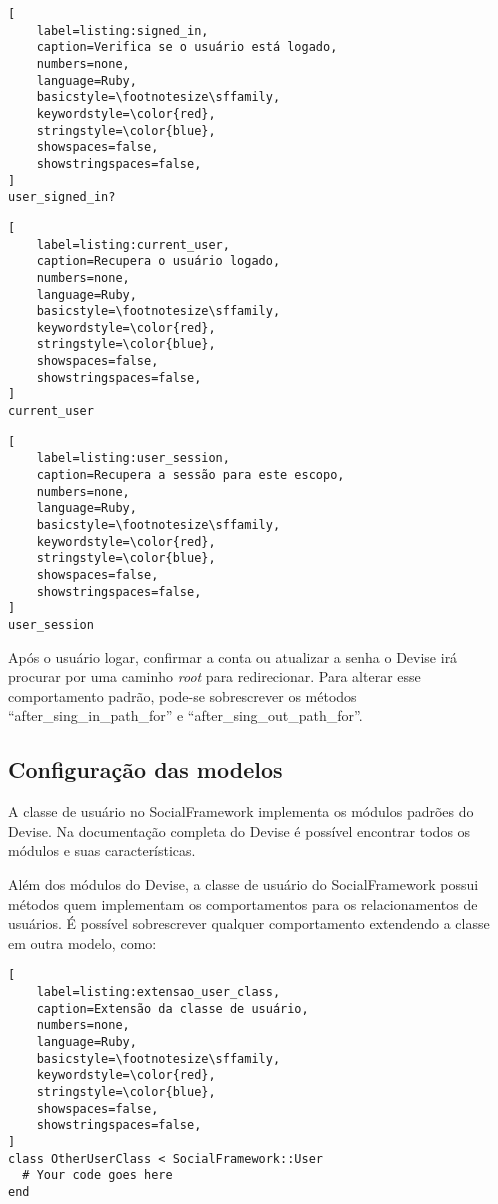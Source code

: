 \begin{lstlisting}[
    label=listing:signed_in,
    caption=Verifica se o usuário está logado,
    numbers=none,
    language=Ruby,
    basicstyle=\footnotesize\sffamily,
    keywordstyle=\color{red},
    stringstyle=\color{blue},
    showspaces=false,
    showstringspaces=false,
]
user_signed_in?
\end{lstlisting}

\begin{lstlisting}[
    label=listing:current_user,
    caption=Recupera o usuário logado,
    numbers=none,
    language=Ruby,
    basicstyle=\footnotesize\sffamily,
    keywordstyle=\color{red},
    stringstyle=\color{blue},
    showspaces=false,
    showstringspaces=false,
]
current_user
\end{lstlisting}

\begin{lstlisting}[
    label=listing:user_session,
    caption=Recupera a sessão para este escopo,
    numbers=none,
    language=Ruby,
    basicstyle=\footnotesize\sffamily,
    keywordstyle=\color{red},
    stringstyle=\color{blue},
    showspaces=false,
    showstringspaces=false,
]
user_session
\end{lstlisting}

Após o usuário logar, confirmar a conta ou atualizar a senha o Devise irá procurar por uma caminho \textit{root} para redirecionar. Para alterar esse comportamento padrão, pode-se sobrescrever os métodos ``after\_sing\_in\_path\_for'' e ``after\_sing\_out\_path\_for''.

\subsection{Configuração das modelos}

A classe de usuário no SocialFramework implementa os módulos padrões do Devise. Na documentação completa do Devise é possível encontrar todos os módulos e suas características.

Além dos módulos do Devise, a classe de usuário do SocialFramework possui métodos quem implementam os comportamentos para os relacionamentos de usuários. É possível sobrescrever qualquer comportamento extendendo a classe em outra modelo, como:

\begin{lstlisting}[
    label=listing:extensao_user_class,
    caption=Extensão da classe de usuário,
    numbers=none,
    language=Ruby,
    basicstyle=\footnotesize\sffamily,
    keywordstyle=\color{red},
    stringstyle=\color{blue},
    showspaces=false,
    showstringspaces=false,
]
class OtherUserClass < SocialFramework::User
  # Your code goes here
end
\end{lstlisting}

